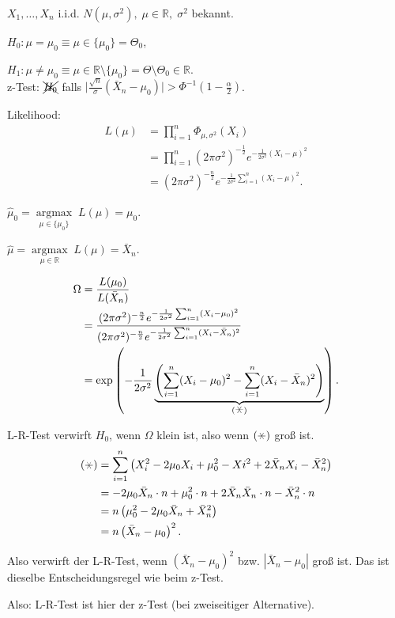 \documentclass{tstextbook}
\DeclareMathOperator{\argmax}{argmax}
\newcommand{\R}{\mathbb R}
\begin{document}
\begin{example}
	$ X_1,\ldots,X_n $ i.i.d. $ N(\mu,\sigma^2), \; \mu\in\R, \; \sigma^2 $ bekannt. 
	
	$ H_0\colon\mu=\mu_0 \equiv \mu\in\lbrace\mu_0\rbrace = \Theta_0 $, 
	
	
	$ H_1\colon\mu\ne\mu_0 \equiv \mu\in\R\setminus\lbrace\mu_0\rbrace = \Theta\setminus\Theta_0 \in \R $. \\
	
	z-Test: $ \xcancel{H_0} $ falls $ \big|\frac{\sqrt{n}}{\sigma}(\bar{X}_n-\mu_0)\big| > \Phi^{-1}\left(1-\frac{\alpha}{2}\right) $.
	
	Likelihood: 
	\[
	\begin{aligned}
		L(\mu) & = \prod_{i=1}^{n}\Phi_{\mu,\sigma^2}(X_i) \\
		& = \prod_{i=1}^{n}(2\pi\sigma^2)^{-\frac{1}{2}} e^{-\frac{1}{2\sigma^2}(X_i-\mu)^2} \\
		& = (2\pi\sigma^2)^{-\frac{n}{2}} e^{-\frac{1}{2\sigma^2}\sum_{i=1}^{n}(X_i-\mu)^2} .
	\end{aligned}
	\]
	
	$ \hat{\mu}_0 = \underset{\mu\in\lbrace\mu_0\rbrace}{\argmax} \; L(\mu) = \mu_0 $. 
	
	$ \hat{\mu} = \underset{\mu\in\R}{\argmax} \; L(\mu) = \bar{X}_n $. 
	
	\[
	\begin{aligned}
		\Omega & = \frac{L(\mu_0)}{L(\bar{X}_n)} \\
		& = \frac{(2\pi\sigma^2)^{-\frac{n}{2}} e^{-\frac{1}{2\sigma^2}\sum_{i=1}^{n}(X_i-\mu_0)^2}}{(2\pi\sigma^2)^{-\frac{n}{2}} e^{-\frac{1}{2\sigma^2}\sum_{i=1}^{n}(X_i-\bar{X}_n)^2}} \\
		& = \exp\left(-\frac{1}{2\sigma^2}\underbrace{\left(\sum_{i=1}^{n}(X_i-\mu_0)^2-\sum_{i=1}^{n}(X_i-\bar{X}_n)^2\right)}_{(\hexstar)}\right).
	\end{aligned}
	\]
	
	L-R-Test verwirft $ H_0 $, wenn $ \Omega $ klein ist, also wenn $ (\hexstar) $ groß ist. 
	\[
	\begin{aligned}
		(\hexstar) & = \sum_{i=1}^{n}\left(X_i^2-2\mu_0X_i+\mu_0^2-Xi^2+2\bar{X}_n X_i -\bar{X}_n^2\right) \\
		& = -2\mu_0\bar{X}_n\cdot n + \mu_0^2\cdot n + 2\bar{X}_n\bar{X}_n\cdot n -\bar{X}_n^2\cdot n \\
		& = n\left(\mu_0^2-2\mu_0\bar{X}_n+\bar{X}_n^2\right) \\
		& = n\left(\bar{X}_n-\mu_0\right)^2.
	\end{aligned}
	\]
	
	Also verwirft der L-R-Test, wenn $ \left(\bar{X}_n-\mu_0\right)^2 $ bzw. $ |\bar{X}_n-\mu_0| $ groß ist. Das ist dieselbe Entscheidungsregel wie beim z-Test. 
	
	Also: L-R-Test ist hier der z-Test (bei zweiseitiger Alternative).
	
\end{example}
\end{document}
